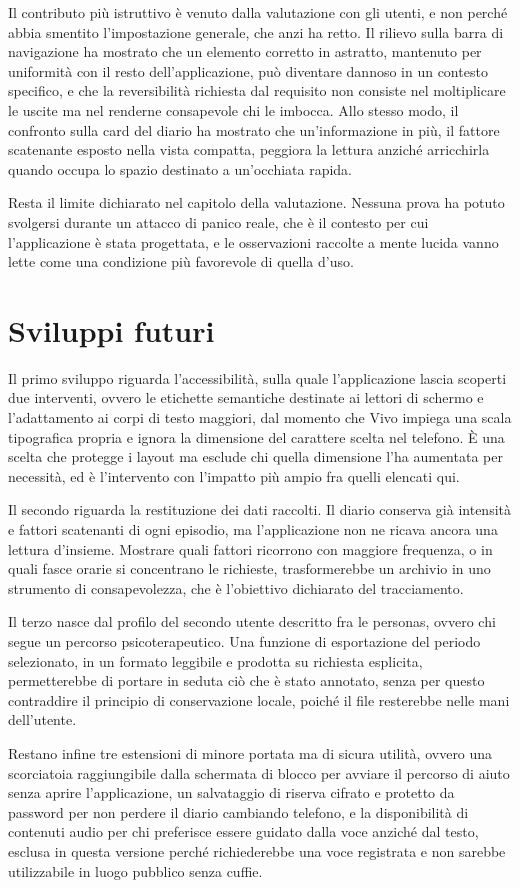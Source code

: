 Il contributo più istruttivo è venuto dalla valutazione con gli utenti, e non perché abbia smentito l'impostazione generale, che anzi ha retto.
Il rilievo sulla barra di navigazione ha mostrato che un elemento corretto in astratto, mantenuto per uniformità con il resto dell'applicazione, può diventare dannoso in un contesto specifico, e che la reversibilità richiesta dal requisito non consiste nel moltiplicare le uscite ma nel renderne consapevole chi le imbocca.
Allo stesso modo, il confronto sulla card del diario ha mostrato che un'informazione in più, il fattore scatenante esposto nella vista compatta, peggiora la lettura anziché arricchirla quando occupa lo spazio destinato a un'occhiata rapida.

Resta il limite dichiarato nel capitolo della valutazione.
Nessuna prova ha potuto svolgersi durante un attacco di panico reale, che è il contesto per cui l'applicazione è stata progettata, e le osservazioni raccolte a mente lucida vanno lette come una condizione più favorevole di quella d'uso.

\section{Sviluppi futuri}
\label{sec:sviluppi-futuri}

Il primo sviluppo riguarda l'accessibilità, sulla quale l'applicazione lascia scoperti due interventi, ovvero le etichette semantiche destinate ai lettori di schermo e l'adattamento ai corpi di testo maggiori, dal momento che Vivo impiega una scala tipografica propria e ignora la dimensione del carattere scelta nel telefono.
È una scelta che protegge i layout ma esclude chi quella dimensione l'ha aumentata per necessità, ed è l'intervento con l'impatto più ampio fra quelli elencati qui.

Il secondo riguarda la restituzione dei dati raccolti.
Il diario conserva già intensità e fattori scatenanti di ogni episodio, ma l'applicazione non ne ricava ancora una lettura d'insieme.
Mostrare quali fattori ricorrono con maggiore frequenza, o in quali fasce orarie si concentrano le richieste, trasformerebbe un archivio in uno strumento di consapevolezza, che è l'obiettivo dichiarato del tracciamento.

Il terzo nasce dal profilo del secondo utente descritto fra le personas, ovvero chi segue un percorso psicoterapeutico.
Una funzione di esportazione del periodo selezionato, in un formato leggibile e prodotta su richiesta esplicita, permetterebbe di portare in seduta ciò che è stato annotato, senza per questo contraddire il principio di conservazione locale, poiché il file resterebbe nelle mani dell'utente.

Restano infine tre estensioni di minore portata ma di sicura utilità, ovvero una scorciatoia raggiungibile dalla schermata di blocco per avviare il percorso di aiuto senza aprire l'applicazione, un salvataggio di riserva cifrato e protetto da password per non perdere il diario cambiando telefono, e la disponibilità di contenuti audio per chi preferisce essere guidato dalla voce anziché dal testo, esclusa in questa versione perché richiederebbe una voce registrata e non sarebbe utilizzabile in luogo pubblico senza cuffie.

